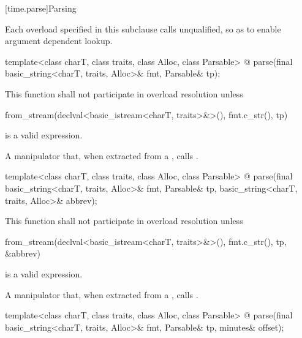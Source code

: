 %

[time.parse]{Parsing}

%

\pnum
Each  overload specified in this subclause
calls  unqualified,
so as to enable argument dependent lookup.

\begin{itemdecl}
template<class charT, class traits, class Alloc, class Parsable>
  @\unspec@
    parse(final basic_string<charT, traits, Alloc>& fmt, Parsable& tp);
\end{itemdecl}

\begin{itemdescr}
\pnum
\remarks
This function shall not participate in overload resolution unless
\begin{codeblock}
from_stream(declval<basic_istream<charT, traits>&>(), fmt.c_str(), tp)
\end{codeblock}
is a valid expression.

\pnum
\returns
A manipulator that, when extracted from a
 ,
calls .
\end{itemdescr}

\begin{itemdecl}
template<class charT, class traits, class Alloc, class Parsable>
  @\unspec@
    parse(final basic_string<charT, traits, Alloc>& fmt, Parsable& tp,
          basic_string<charT, traits, Alloc>& abbrev);
\end{itemdecl}

\begin{itemdescr}
\pnum
\remarks
This function shall not participate in overload resolution unless
\begin{codeblock}
from_stream(declval<basic_istream<charT, traits>&>(), fmt.c_str(), tp, &abbrev)
\end{codeblock}
is a valid expression.

\pnum
\returns
A manipulator that, when extracted from a
 ,
calls .
\end{itemdescr}

\begin{itemdecl}
template<class charT, class traits, class Alloc, class Parsable>
  @\unspec@
    parse(final basic_string<charT, traits, Alloc>& fmt, Parsable& tp,
          minutes& offset);
\end{itemdecl}

